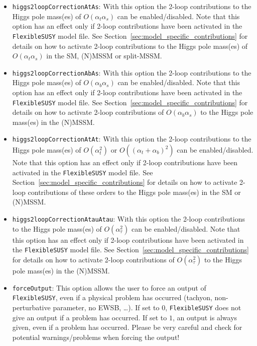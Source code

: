 \documentclass[final,3p,11pt,pdflatex]{elsarticle}
\makeatletter
\newcommand{\fs}{\texttt{FlexibleSUSY}\@\xspace}
\newcommand{\secref}[1]{Section~\ref{#1}}
\def\at{\alpha_t}
\def\ab{\alpha_b}
\def\as{\alpha_s}
\def\atau{\alpha_{\tau}}
\makeatother
\begin{document}
\begin{itemize}
\item[\texttt{FlexibleSUSY[8]},] \texttt{higgs2loopCorrectionAtAs}:
  With this option the 2-loop contributions to the Higgs pole mass(es)
  of $O(\at\as)$ can be enabled/disabled.  Note that this
  option has an effect only if 2-loop contributions have been
  activated in the \fs model file.  See
  \secref{sec:model_specific_contributions} for details on how to
  activate 2-loop contributions to the Higgs pole mass(es) of
  $O(\at\as)$ in the SM, (N)MSSM or split-MSSM\@.

\item[\texttt{FlexibleSUSY[9]},] \texttt{higgs2loopCorrectionAbAs}:
  With this option the 2-loop contributions to the Higgs pole mass(es)
  of $O(\ab\as)$ can be enabled/disabled.  Note that this
  option has an effect only if 2-loop contributions have been
  activated in the \fs model file.  See
  \secref{sec:model_specific_contributions} for details on how to
  activate 2-loop contributions of $O(\ab\as)$ to the Higgs pole
  mass(es) in the (N)MSSM\@.

\item[\texttt{FlexibleSUSY[10]},] \texttt{higgs2loopCorrectionAtAt}:
  With this option the 2-loop contributions to the Higgs pole mass(es)
  of $O(\at^2)$ or $O((\at+\ab)^2)$ can be enabled/disabled.
  Note that this option has an effect only if 2-loop contributions
  have been activated in the \fs model file.  See
  \secref{sec:model_specific_contributions} for details on how to
  activate 2-loop contributions of these orders to the Higgs pole
  mass(es) in the SM or (N)MSSM\@.

\item[\texttt{FlexibleSUSY[11]},]
  \texttt{higgs2loopCorrectionAtauAtau}: With this option the 2-loop
  contributions to the Higgs pole mass(es) of $O(\atau^2)$
  can be enabled/disabled.  Note that this option has an effect only
  if 2-loop contributions have been activated in the \fs model file.
  See \secref{sec:model_specific_contributions} for details on how to
  activate 2-loop contributions of $O(\atau^2)$ to the Higgs pole
  mass(es) in the (N)MSSM\@.

\item[\texttt{FlexibleSUSY[12]},] \texttt{forceOutput}: This option
  allows the user to force an output of \fs, even if a physical
  problem has occurred (tachyon, non-perturbative parameter, no EWSB,
  \ldots).  If set to $0$, \fs does not give an output if a problem
  has occurred.  If set to $1$, an output is always given, even if a
  problem has occurred.  Please be very careful and check for
  potential warnings/problems when forcing the output!


\end{itemize}
\end{document}
